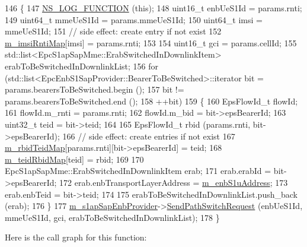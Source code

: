 \begin{DoxyCode}
146 \{
147   \hyperlink{log-macros-disabled_8h_a90b90d5bad1f39cb1b64923ea94c0761}{NS\_LOG\_FUNCTION} (\textcolor{keyword}{this});
148   uint16\_t enbUeS1Id = params.rnti;  
149   uint64\_t mmeUeS1Id = params.mmeUeS1Id;
150   uint64\_t imsi = mmeUeS1Id;
151   \textcolor{comment}{// side effect: create entry if not exist}
152   \hyperlink{classns3_1_1EpcEnbApplication_a9e51467fe97aafabac7d51f056850fea}{m\_imsiRntiMap}[imsi] = params.rnti;
153 
154   uint16\_t gci = params.cellId;
155   std::list<EpcS1apSapMme::ErabSwitchedInDownlinkItem> erabToBeSwitchedInDownlinkList;
156   \textcolor{keywordflow}{for} (std::list<EpcEnbS1SapProvider::BearerToBeSwitched>::iterator bit = params.bearersToBeSwitched.begin 
      ();
157        bit != params.bearersToBeSwitched.end ();
158        ++bit)
159     \{
160       EpsFlowId\_t flowId;
161       flowId.m\_rnti = params.rnti;
162       flowId.m\_bid = bit->epsBearerId;
163       uint32\_t teid = bit->teid;
164       
165       EpsFlowId\_t rbid (params.rnti, bit->epsBearerId);
166       \textcolor{comment}{// side effect: create entries if not exist}
167       \hyperlink{classns3_1_1EpcEnbApplication_a06ad312a7c59dd349c44bbdecf3c7358}{m\_rbidTeidMap}[params.rnti][bit->epsBearerId] = teid;
168       \hyperlink{classns3_1_1EpcEnbApplication_abc1df9a1103bb552fc8131e9cd45ab33}{m\_teidRbidMap}[teid] = rbid;
169 
170       EpcS1apSapMme::ErabSwitchedInDownlinkItem erab;
171       erab.erabId = bit->epsBearerId;
172       erab.enbTransportLayerAddress = \hyperlink{classns3_1_1EpcEnbApplication_a0edb76abc19ab0ed92f5086c2fad0d1f}{m\_enbS1uAddress};
173       erab.enbTeid = bit->teid;
174 
175       erabToBeSwitchedInDownlinkList.push\_back (erab);
176     \}
177   \hyperlink{classns3_1_1EpcEnbApplication_aea4917aa066399d72225c3408772020f}{m\_s1apSapEnbProvider}->\hyperlink{classns3_1_1EpcS1apSapEnbProvider_a72780aeea16664e1836385c36cc98c67}{SendPathSwitchRequest} (enbUeS1Id, 
      mmeUeS1Id, gci, erabToBeSwitchedInDownlinkList);
178 \}
\end{DoxyCode}


Here is the call graph for this function\+:



